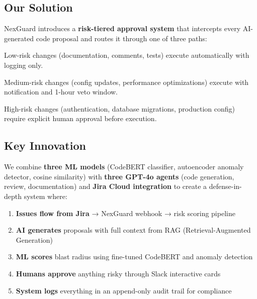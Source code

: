\documentclass[11pt,a4paper]{article}
\begin{document}
\subsection{Our Solution}
NexGuard introduces a \textbf{risk-tiered approval system} that intercepts every AI-generated code proposal and routes it through one of three paths:

\begin{tcolorbox}[colback=green!10,colframe=green!60!black,title=GREEN Tier (Auto-Execute)]
Low-risk changes (documentation, comments, tests) execute automatically with logging only.
\end{tcolorbox}

\begin{tcolorbox}[colback=yellow!10,colframe=yellow!60!black,title=YELLOW Tier (Notify + Veto)]
Medium-risk changes (config updates, performance optimizations) execute with notification and 1-hour veto window.
\end{tcolorbox}

\begin{tcolorbox}[colback=red!10,colframe=red!60!black,title=RED Tier (Hard Block)]
High-risk changes (authentication, database migrations, production config) require explicit human approval before execution.
\end{tcolorbox}

\subsection{Key Innovation}
We combine \textbf{three ML models} (CodeBERT classifier, autoencoder anomaly detector, cosine similarity) with \textbf{three GPT-4o agents} (code generation, review, documentation) and \textbf{Jira Cloud integration} to create a defense-in-depth system where:
\begin{enumerate}
    \item \textbf{Issues flow from Jira} → NexGuard webhook → risk scoring pipeline
    \item \textbf{AI generates} proposals with full context from RAG (Retrieval-Augmented Generation)
    \item \textbf{ML scores} blast radius using fine-tuned CodeBERT and anomaly detection
    \item \textbf{Humans approve} anything risky through Slack interactive cards
    \item \textbf{System logs} everything in an append-only audit trail for compliance
\end{enumerate}
\end{document}
